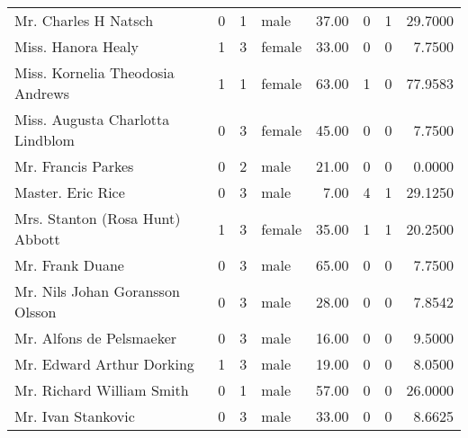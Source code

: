 \begin{tabular}{lrrlrrrr}
Mr. Charles H Natsch                               &         0 &       1 &    male &  37.00 &                        0 &                        1 &   29.7000 \\
Miss. Hanora Healy                                 &         1 &       3 &  female &  33.00 &                        0 &                        0 &    7.7500 \\
Miss. Kornelia Theodosia Andrews                   &         1 &       1 &  female &  63.00 &                        1 &                        0 &   77.9583 \\
Miss. Augusta Charlotta Lindblom                   &         0 &       3 &  female &  45.00 &                        0 &                        0 &    7.7500 \\
Mr. Francis Parkes                                 &         0 &       2 &    male &  21.00 &                        0 &                        0 &    0.0000 \\
Master. Eric Rice                                  &         0 &       3 &    male &   7.00 &                        4 &                        1 &   29.1250 \\
Mrs. Stanton (Rosa Hunt) Abbott                    &         1 &       3 &  female &  35.00 &                        1 &                        1 &   20.2500 \\
Mr. Frank Duane                                    &         0 &       3 &    male &  65.00 &                        0 &                        0 &    7.7500 \\
Mr. Nils Johan Goransson Olsson                    &         0 &       3 &    male &  28.00 &                        0 &                        0 &    7.8542 \\
Mr. Alfons de Pelsmaeker                           &         0 &       3 &    male &  16.00 &                        0 &                        0 &    9.5000 \\
Mr. Edward Arthur Dorking                          &         1 &       3 &    male &  19.00 &                        0 &                        0 &    8.0500 \\
Mr. Richard William Smith                          &         0 &       1 &    male &  57.00 &                        0 &                        0 &   26.0000 \\
Mr. Ivan Stankovic                                 &         0 &       3 &    male &  33.00 &                        0 &                        0 &    8.6625 \\

\end{tabular}
